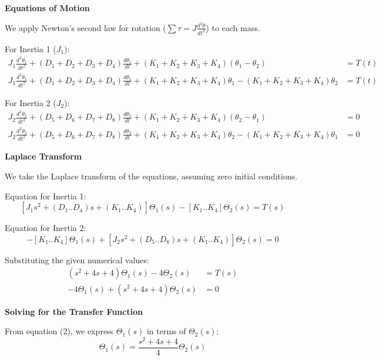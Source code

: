 \documentclass[11pt]{article}
\begin{document}
\noindent\textbf{Equations of Motion}

\vspace{8pt}

\noindent We apply Newton's second law for rotation ($\sum \tau = J \frac{d^2\theta}{dt^2}$) to each mass.

\vspace{8pt}

{For Inertia 1 ($J_1$):}
\begin{align*}
    J_1 \frac{d^2\theta_1}{dt^2} + (D_1+D_2+D_3+D_4)\frac{d\theta_1}{dt} + (K_1+K_2+K_3+K_4)(\theta_1 - \theta_2) &= T(t) \\
    J_1 \frac{d^2\theta_1}{dt^2} + (D_1+D_2+D_3+D_4)\frac{d\theta_1}{dt} + (K_1+K_2+K_3+K_4)\theta_1 - (K_1+K_2+K_3+K_4)\theta_2 &= T(t)
\end{align*}

{For Inertia 2 ($J_2$):}
\begin{align*}
    J_2 \frac{d^2\theta_2}{dt^2} + (D_5+D_6+D_7+D_8)\frac{d\theta_2}{dt} + (K_1+K_2+K_3+K_4)(\theta_2 - \theta_1) &= 0 \\
    J_2 \frac{d^2\theta_2}{dt^2} + (D_5+D_6+D_7+D_8)\frac{d\theta_2}{dt} + (K_1+K_2+K_3+K_4)\theta_2 - (K_1+K_2+K_3+K_4)\theta_1 &= 0
\end{align*}

\newpage
\noindent\textbf{Laplace Transform}

\vspace{12pt}

We take the Laplace transform of the equations, assuming zero initial conditions.

\vspace{8pt}

Equation for Inertia 1:
\[
[J_1 s^2 + (D_1..D_4)s + (K_1..K_4)]\Theta_1(s) - [K_1..K_4]\Theta_2(s) = T(s)
\]

Equation for Inertia 2:
\[
-[K_1..K_4]\Theta_1(s) + [J_2 s^2 + (D_5..D_8)s + (K_1..K_4)]\Theta_2(s) = 0
\]

Substituting the given numerical values:
\begin{align}
    (s^2 + 4s + 4)\Theta_1(s) - 4\Theta_2(s) &= T(s) \tag{1} \\
    -4\Theta_1(s) + (s^2 + 4s + 4)\Theta_2(s) &= 0 \tag{2}
\end{align}

\noindent\textbf{Solving for the Transfer Function}
\vspace{8pt}

From equation (2), we express $\Theta_1(s)$ in terms of $\Theta_2(s)$:
\[
\Theta_1(s) = \frac{s^2 + 4s + 4}{4} \Theta_2(s)
\]
\end{document}
